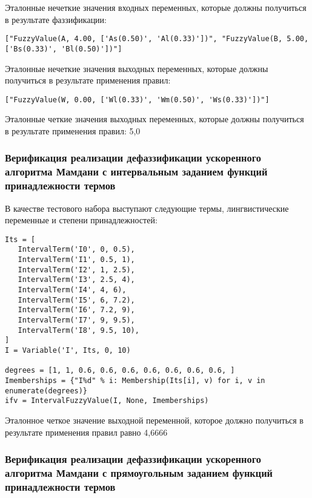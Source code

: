 Эталонные нечеткие значения входных переменных, которые должны получиться в результате фаззификации:

\begin{lstlisting}[style=pythonstyle,caption={  }, label=lst:func:1]
["FuzzyValue(A, 4.00, ['As(0.50)', 'Al(0.33)'])", "FuzzyValue(B, 5.00, ['Bs(0.33)', 'Bl(0.50)'])"]
\end{lstlisting}

Эталонные нечеткие значения выходных переменных, которые должны получиться в результате применения правил:

\begin{lstlisting}[style=pythonstyle,caption={  }, label=lst:func:1]
["FuzzyValue(W, 0.00, ['Wl(0.33)', 'Wm(0.50)', 'Ws(0.33)'])"]
\end{lstlisting}

Эталонные четкие значения выходных переменных, которые должны получиться в результате применения правил: 5,0

\subsubsection{Верификация реализации дефаззификации ускоренного алгоритма Мамдани с интервальным заданием функций принадлежности термов }

В качестве тестового набора выступают следующие термы, лингвистические переменные и степени принадлежностей:

\begin{lstlisting}[style=pythonstyle,caption={  }, label=lst:func:1]
Its = [
   IntervalTerm('I0', 0, 0.5),
   IntervalTerm('I1', 0.5, 1),
   IntervalTerm('I2', 1, 2.5),
   IntervalTerm('I3', 2.5, 4),
   IntervalTerm('I4', 4, 6),
   IntervalTerm('I5', 6, 7.2),
   IntervalTerm('I6', 7.2, 9),
   IntervalTerm('I7', 9, 9.5),
   IntervalTerm('I8', 9.5, 10),
]
I = Variable('I', Its, 0, 10)

degrees = [1, 1, 0.6, 0.6, 0.6, 0.6, 0.6, 0.6, 0.6, ]
Imemberships = {"I%d" % i: Membership(Its[i], v) for i, v in enumerate(degrees)}
ifv = IntervalFuzzyValue(I, None, Imemberships)
\end{lstlisting}


Эталонное четкое значение выходной переменной, которое должно получиться в результате применения правил равно 4,6666

\subsubsection{Верификация реализации дефаззификации ускоренного алгоритма Мамдани с прямоугольным заданием функций принадлежности термов }

